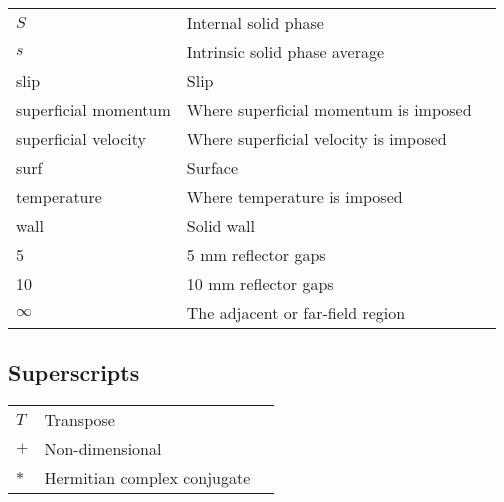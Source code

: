 \begin{longtable}{p{4cm}p{9cm}p{5cm}}
\(S\) & Internal solid phase & \\
\(s\) & Intrinsic solid phase average &\\
slip & Slip & \\
superficial momentum & Where superficial momentum is imposed & \\
superficial velocity & Where superficial velocity is imposed & \\
surf & Surface & \\
temperature & Where temperature is imposed & \\
wall & Solid wall & \\
5 & 5 \si{\milli\meter} reflector gaps & \\
10 & 10 \si{\milli\meter} reflector gaps & \\
\(\infty\) & The adjacent or far-field region &\\
\end{longtable}

\subsection*{Superscripts}
\begin{longtable}{p{4cm}p{9cm}p{5cm}}
\(T\) & Transpose &\\
\(+\) & Non-dimensional &\\
\(*\) & Hermitian complex conjugate &\\
\end{longtable}

